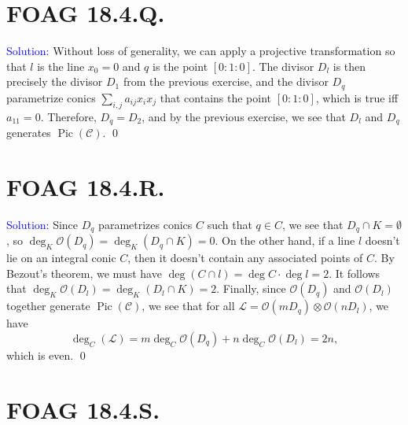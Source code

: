 \documentclass[11pt]{article}
\newcommand{\cC}{\mathcal{C}}
\newcommand{\cL}{\mathcal{L}}
\newcommand{\cO}{\mathcal{O}}
\newcommand{\Pic}{\operatorname{Pic}}
\newenvironment{solution}{\begin{trivlist}\item[]{\textcolor{blue}{Solution:}}}{\qed \end{trivlist}}
\begin{document}
\newpage

\section*{FOAG 18.4.Q.}

\begin{solution}
    Without loss of generality, we can apply a projective transformation so that $l$ is the line $x_0 = 0$ and $q$ is the point $[0:1:0]$. The divisor $D_l$ is then precisely the divisor $D_1$ from the previous exercise, and the divisor $D_q$ parametrize conics $\sum_{i,j} a_{ij} x_i x_j$ that contains the point $[0:1:0]$, which is true iff $a_{11} = 0$. Therefore, $D_q = D_2$, and by the previous exercise, we see that $D_l$ and $D_q$ generates $\Pic(\cC)$.
\end{solution}

\newpage

\section*{FOAG 18.4.R.}

\begin{solution}
    Since $D_q$ parametrizes conics $C$ such that $q \in C$, we see that $D_q \cap K = \emptyset$, so $\deg_{K} \cO(D_q) = \deg_K (D_q \cap K) = 0$. On the other hand, if a line $l$ doesn't lie on an integral conic $C$, then it doesn't contain any associated points of $C$. By Bezout's theorem, we must have $\deg (C \cap l) = \deg C \cdot \deg l = 2$. It follows that $\deg_K \cO (D_l) = \deg_K (D_l \cap K) = 2$. Finally, since $\cO(D_q)$ and $\cO(D_l)$ together generate $\Pic(\cC)$, we see that for all $\cL = \cO(mD_q) \otimes \cO(nD_l)$, we have 
    \[
        \deg_C(\cL) = m \deg_C \cO(D_q) + n \deg_C \cO(D_l) = 2n, 
    \]
    which is even.
\end{solution}

\newpage

\section*{FOAG 18.4.S.}
\end{document}
